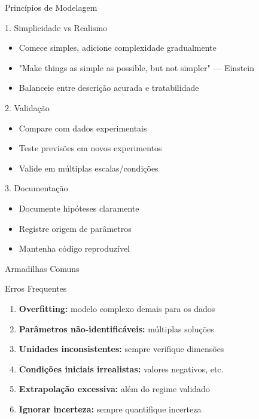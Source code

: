 \begin{frame}[shrink=15]{Princípios de Modelagem}
\begin{block}{1. Simplicidade vs Realismo}
\begin{itemize}
    \item Comece simples, adicione complexidade gradualmente
    \item "Make things as simple as possible, but not simpler" --- Einstein
    \item Balanceie entre descrição acurada e tratabilidade
\end{itemize}
\end{block}

\begin{block}{2. Validação}
\begin{itemize}
    \item Compare com dados experimentais
    \item Teste previsões em novos experimentos
    \item Valide em múltiplas escalas/condições
\end{itemize}
\end{block}

\begin{block}{3. Documentação}
\begin{itemize}
    \item Documente hipóteses claramente
    \item Registre origem de parâmetros
    \item Mantenha código reproduzível
\end{itemize}
\end{block}
\end{frame}

\begin{frame}[shrink]{Armadilhas Comuns}
\begin{alertblock}{Erros Frequentes}
\begin{enumerate}
    \item \textbf{Overfitting:} modelo complexo demais para os dados
    \item \textbf{Parâmetros não-identificáveis:} múltiplas soluções
    \item \textbf{Unidades inconsistentes:} sempre verifique dimensões
    \item \textbf{Condições iniciais irrealistas:} valores negativos, etc.
    \item \textbf{Extrapolação excessiva:} além do regime validado
    \item \textbf{Ignorar incerteza:} sempre quantifique incerteza
\end{enumerate}
\end{alertblock}

\end{frame}

